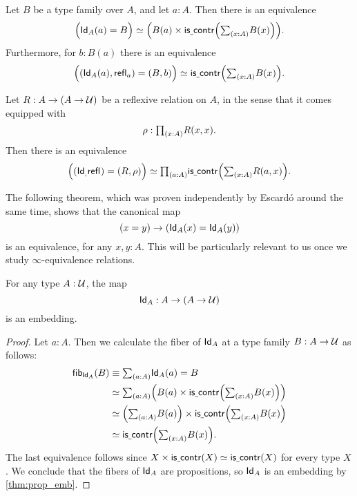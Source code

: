\begin{cor}
Let $B$ be a type family over $A$, and let $a:A$. Then there is an equivalence
\begin{equation*}
\eqv{\Big(\idtypevar{A}(a)=B\Big)}{\Big(B(a)\times\iscontr\Big(\sm{x:A}B(x)\Big)\Big)}.
\end{equation*}
Furthermore, for $b:B(a)$ there is an equivalence
\begin{equation*}
\eqv{\Big((\idtypevar{A}(a),\refl{a})=(B,b)\Big)}{\iscontr\Big(\sm{x:A}B(x)\Big)}.
\end{equation*}
\end{cor}

\begin{cor}\label{cor:yoneda_rel}
Let $R:A\to (A\to \mathcal{U})$ be a reflexive relation on $A$, in the sense that it comes equipped with
\begin{equation*}
\rho : \prd{x:A}R(x,x).
\end{equation*}
Then there is an equivalence
\begin{equation*}
\eqv{\Big((\idtypevar,\refl{})=(R,\rho)\Big)}{\prd{a:A}\iscontr\Big(\sm{x:A}R(a,x)\Big)}.
\end{equation*}
\end{cor}

The following theorem, which was proven independently by Escardó \cite{Escardo2016} around the same time, shows that the canonical map
\begin{equation*}
(x=y)\to (\mathsf{Id}_{A}(x)=\mathsf{Id}_{A}(y))
\end{equation*}
is an equivalence, for any $x,y:A$. This will be particularly relevant to us once we study $\infty$-equivalence relations.

\begin{prp}
For any type $A:\mathcal{U}$, the map
\begin{equation*}
\mathsf{Id}_{A}:A\to (A\to\mathcal{U})
\end{equation*}
is an embedding.
\end{prp}

\begin{proof}
Let $a:A$. Then we calculate the fiber of $\mathsf{Id}_{A}$ at a type family $B:A\to \mathcal{U}$ as follows:
\begin{align*}
\fib{\idtypevar{A}}{B} & \jdeq \sm{a:A}\idtypevar{A}(a)=B \\
& \eqvsym \sm{a:A} \Big(B(a)\times\iscontr\Big(\sm{x:A}B(x)\Big)\Big) \\
& \eqvsym \Big(\sm{a:A}B(a)\Big)\times \iscontr\Big(\sm{x:A}B(x)\Big) \\
& \eqvsym \iscontr\Big(\sm{x:A}B(x)\Big).
\end{align*}
The last equivalence follows since $X\times \mathsf{is\underline{\ }{}contr}(X)\simeq \mathsf{is\underline{\ }{}contr}(X)$ for every type $X$. We conclude that the fibers of $\mathsf{Id}_{A}$ are propositions, so $\mathsf{Id}_{A}$ is an embedding by \cref{thm:prop_emb}.
\end{proof}


